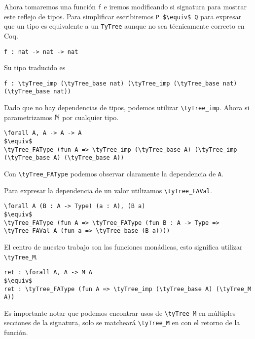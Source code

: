 Ahora tomaremos una función \lstinline{f} e iremos modificando si signatura para mostrar este reflejo de tipos.
Para simplificar escribiremos \lstinline{P $\equiv$ Q} para expresar que un tipo es equivalente a un \lstinline{TyTree} aunque no sea técnicamente correcto en Coq.

\begin{lstlisting}
f : nat -> nat -> nat
\end{lstlisting}

Su tipo traducido es

\begin{lstlisting}
f : \tyTree_imp (\tyTree_base nat) (\tyTree_imp (\tyTree_base nat) (\tyTree_base nat))
\end{lstlisting}

Dado que no hay dependencias de tipos, podemos utilizar \lstinline{\tyTree_imp}. Ahora si parametrizamos
$\mathbb{N}$ por cualquier tipo.

\begin{lstlisting}
\forall A, A -> A -> A
$\equiv$
\tyTree_FAType (fun A => \tyTree_imp (\tyTree_base A) (\tyTree_imp (\tyTree_base A) (\tyTree_base A))
\end{lstlisting}

Con \lstinline{\tyTree_FAType} podemos observar claramente la dependencia de \lstinline{A}.

Para expresar la dependencia de un valor utilizamos \lstinline{\tyTree_FAVal}.

\begin{lstlisting}
\forall A (B : A -> Type) (a : A), (B a)
$\equiv$
\tyTree_FAType (fun A => \tyTree_FAType (fun B : A -> Type => \tyTree_FAVal A (fun a => \tyTree_base (B a))))
\end{lstlisting}

El centro de nuestro trabajo son las funciones monádicas, esto significa utilizar \lstinline{\tyTree_M}.

\begin{lstlisting}
ret : \forall A, A -> M A
$\equiv$
ret : \tyTree_FAType (fun A => \tyTree_imp (\tyTree_base A) (\tyTree_M A))
\end{lstlisting}

Es importante notar que podemos encontrar usos de \lstinline{\tyTree_M} en múltiples secciones de la signatura, solo se matcheará \lstinline{\tyTree_M} en \lift con el retorno de la función. 


